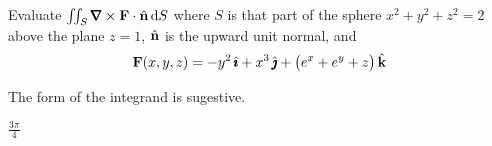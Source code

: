 \begin{question}[M317 2006A] %
Evaluate $\dblInt_S \vnabla\times\vF\cdot\hn\,\dee{S}$ where $S$ is that part 
of the sphere $x^2+y^2+z^2=2$ above the plane $z=1$, $\hat{\mathbf{n}}$ is the upward
unit normal, and
\begin{align*}
\mathbf{F}(x,y,z) = -y^2\,\hat{\pmb{\imath}}  +x^3\,\hat{\pmb{\jmath}} + \big(e^x + e^y +z\big)\,\hat{\mathbf{k}} 
\end{align*}

\end{question}

\begin{hint} 
The form of the integrand is sugestive.
\end{hint}

\begin{answer} 
$\frac{3\pi}{4}$
\end{answer}


